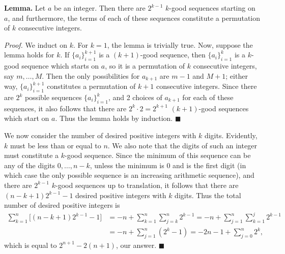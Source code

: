\begin{enumerate}
 \textbf{Lemma.}  Let $a$ be an integer.  Then there are $2^{k-1}$ $k$-good sequences starting on $a$, and furthermore, the terms of each of these sequences constitute a permutation of $k$ consecutive integers.

 \textit{Proof.} We induct on $k$.  For $k=1$, the lemma is trivially true.  Now, suppose the lemma holds for $k$.  If $\{ a_i \}_{i=1}^{k+1}$ is a $(k+1)$-good sequence, then $\{ a_i \}_{i=1}^k$ is a $k$-good sequence which starts on $a$, so it is a permutation of $k$ consecutive integers, say $m, \dotsc, M$.  Then the only possibilities for $a_{k+1}$ are $m-1$ and $M+1$; either way, $\{ a_i \}_{i=1}^{k+1}$ constitutes a permutation of $k+1$ consecutive integers.  Since there are $2^k$ possible sequences $\{a_i\}_{i=1}^k$, and 2 choices of $a_{k+1}$ for each of these sequences, it also follows that there are $2^k \cdot 2 = 2^{k+1}$ $(k+1)$-good sequences which start on $a$.  Thus the lemma holds by induction.  $\blacksquare$

 We now consider the number of desired positive integers with $k$ digits.  Evidently, $k$ must be less than or equal to $n$.  We also note that the digits of such an integer must constitute a $k$-good sequence.  Since the minimum of this sequence can be any of the digits $0, \dotsc, n-k$, unless the minimum is 0 and is the first digit (in which case the only possible sequence is an increasing arithmetic sequence), and there are $2^{k-1}$ $k$-good sequences up to translation, it follows that there are $(n-k+1) 2^{k-1}-1$ desired positive integers with $k$ digits.  Thus the total number of desired positive integers is
 \begin{align*} \sum_{k=1}^n \bigl[ (n-k+1) 2^{k-1}-1 \bigr] &= -n + \sum_{k=1}^n \sum_{j=k}^n 2^{k-1} = -n + \sum_{j=1}^n \sum_{k=1}^j 2^{k-1} \\ &= -n + \sum_{j=1}^n (2^k-1) = - 2n -1 + \sum_{j=0}^n 2^k, \end{align*}
which is equal to $2^{n+1} - 2(n+1)$, our answer.  $\blacksquare$

 



\end{enumerate}
